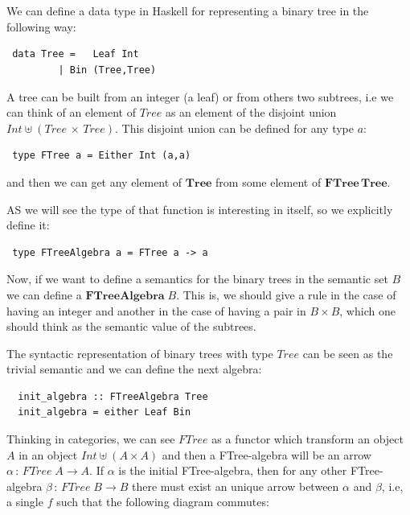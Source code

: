\documentclass[a4paper,10pt]{article}
\begin{document}
\

\

We can define a data type in Haskell for representing a binary tree in the following way:

\begin{lstlisting}
 data Tree =   Leaf Int 
	     | Bin (Tree,Tree)
\end{lstlisting}

A tree can be built from an integer (a leaf) or from others two subtrees, i.e we
can think of an element of $Tree$ as an element of the disjoint union  
$Int \uplus (Tree\,\times\,Tree)$. This disjoint union can be defined for any
type $a$:

\begin{lstlisting}
 type FTree a = Either Int (a,a)
\end{lstlisting}

\noindent and then we can get any element of $\mathbf{Tree}$ from some element
of $\mathbf{FTree\,Tree}$.

AS we will see the type of that function is interesting in itself, so we explicitly
define it:

\begin{lstlisting}
 type FTreeAlgebra a = FTree a -> a
\end{lstlisting}

Now, if we want to define a semantics for the binary trees in the semantic set $B$ we can
define a $\mathbf{FTreeAlgebra}\;B$. This is, we should give a rule in the case of having
an integer and another in the case of having a pair in $B \times B$, which one should think
as the semantic value of the subtrees.

The syntactic representation of binary trees with type $Tree$ can be seen as the
trivial semantic and we can define the next algebra:

\begin{lstlisting}
  init_algebra :: FTreeAlgebra Tree
  init_algebra = either Leaf Bin
\end{lstlisting}

Thinking in categories, we can see $FTree$ as a functor which transform an object $A$ in
an object $Int \uplus (A \times A)$ and then a FTree-algebra will be an arrow 
$\alpha\,:\,FTree\;A \rightarrow A$. If $\alpha$ is the initial FTree-algebra, then for
any other FTree-algebra $\beta\,:\,FTree\;B \rightarrow B$ there must exist an unique arrow
between $\alpha$ and $\beta$, i.e, a single $f$ such that the following diagram commutes:
\end{document}
